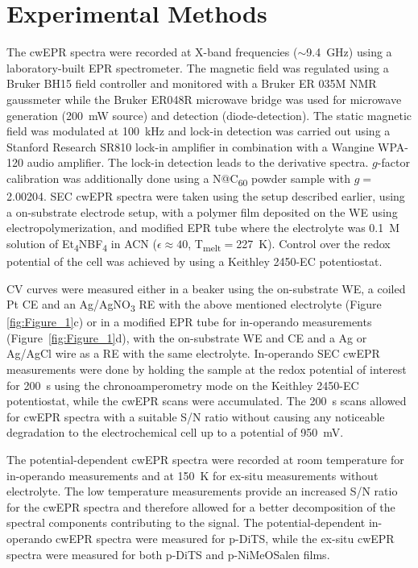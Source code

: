\documentclass{WileyMSP-template}
\begin{document}
\section{Experimental Methods}
The cwEPR spectra were recorded at X-band frequencies ($\sim$9.4~GHz) using a laboratory-built EPR spectrometer. The magnetic field was regulated using a Bruker BH15 field controller and monitored with a Bruker ER 035M NMR gaussmeter while the Bruker ER048R microwave bridge was used for microwave generation (200~mW source) and detection (diode-detection). The static magnetic field was modulated at 100~kHz and lock-in detection was carried out using a Stanford Research SR810 lock-in amplifier in combination with a Wangine WPA-120 audio amplifier. The lock-in detection leads to the derivative spectra. $g$-factor calibration was additionally done using a N@C\textsubscript{60} powder sample with $g=$2.00204. SEC cwEPR spectra were taken using the setup described earlier, using a on-substrate electrode setup, with a polymer film deposited on the WE using electropolymerization, and modified EPR tube where the electrolyte was 0.1~M solution of Et\textsubscript{4}NBF\textsubscript{4} in ACN ($\epsilon\approx40$, T\textsubscript{melt}$=$227~K). Control over the redox potential of the cell was achieved by using a Keithley 2450-EC potentiostat.\\

\bigbreak

CV curves were measured either in a beaker using the on-substrate WE, a coiled Pt CE and an Ag/AgNO\textsubscript{3} RE with the above mentioned electrolyte (Figure \ref{fig:Figure_1}c) or in a modified EPR tube for in-operando measurements (Figure~\ref{fig:Figure_1}d), with the on-substrate WE and CE and a Ag or Ag/AgCl wire as a RE with the same electrolyte. In-operando SEC cwEPR measurements were done by holding the sample at the redox potential of interest for 200~s using the chronoamperometry mode on the Keithley 2450-EC potentiostat, while the cwEPR scans were accumulated. The 200~s scans allowed for cwEPR spectra with a suitable S/N ratio without causing any noticeable degradation to the electrochemical cell up to a potential of 950~mV.\\

\bigbreak

The potential-dependent cwEPR spectra were recorded at room temperature for in-operando measurements and at 150~K for ex-situ measurements without electrolyte. The low temperature measurements provide an increased S/N ratio for the cwEPR spectra and therefore allowed for a better decomposition of the spectral components contributing to the signal. The potential-dependent in-operando cwEPR spectra were measured for p-DiTS, while the ex-situ cwEPR spectra were measured for both p-DiTS and p-NiMeOSalen films.
\end{document}
